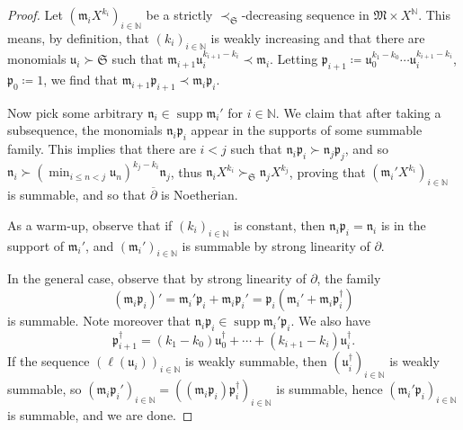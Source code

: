 \documentclass{article}
\newcommand{\assign}{\coloneqq}
\newcommand{\tmop}[1]{\ensuremath{\operatorname{#1}}}
\theoremstyle{remark}\newtheorem*{convention*}{Convention}
\begin{document}
\begin{proof}
  Let $(\mathfrak{m}_i X^{k_i})_{i \in \mathbb{N}}$ be a strictly
  $\prec_{\mathfrak{S}}$-decreasing sequence in $\mathfrak{M} \times
  X^{\mathbb{N}}$. This means, by definition, that $(k_i)_{i \in \mathbb{N}}$
  is weakly increasing and that there are monomials $\mathfrak{u}_i \succ
  \mathfrak{S}$ such that $\mathfrak{m}_{i + 1} \mathfrak{u}_i^{k_{i + 1} -
  k_i} \prec \mathfrak{m}_i$. Letting $\mathfrak{p}_{i + 1} \assign
  \mathfrak{u}_0^{k_1 - k_0} \cdots \mathfrak{u}_i^{k_{i + 1} - k_i}$,
  $\mathfrak{p}_0 \assign 1$, we find that $\mathfrak{m}_{i + 1}
  \mathfrak{p}_{i + 1} \prec \mathfrak{m}_i \mathfrak{p}_i$.
  
  Now pick some arbitrary $\mathfrak{n}_i \in \tmop{supp} \mathfrak{m}_i'$ for
  $i \in \mathbb{N}$. We claim that after taking a subsequence, the monomials
  $\mathfrak{n}_i \mathfrak{p}_i$ appear in the supports of some summable
  family. This implies that there are $i < j$ such that $\overset{}{}
  \mathfrak{n}_i \mathfrak{p}_i \succ \mathfrak{n}_j \mathfrak{p}_j$, and so
  $\mathfrak{n}_i \succ (\min_{i \leqslant n < j} \mathfrak{u}_n) ^{k_j - k_i}
  \mathfrak{n}_j$, thus $\mathfrak{n}_i X^{k_i} \succ_{\mathfrak{S}}
  \mathfrak{n}_j X^{k_j}$, proving that $(\mathfrak{m}_i' X^{k_i})_{i \in
  \mathbb{N}}$ is summable, and so that $\overline{\partial}$ is Noetherian.
  
  As a warm-up, observe that if $(k_i)_{i \in \mathbb{N}}$ is constant, then
  $\mathfrak{n}_i \mathfrak{p}_i =\mathfrak{n}_i$ is in the support of
  $\mathfrak{m}_i'$, and $(\mathfrak{m}_i')_{i \in \mathbb{N}}$ is summable by
  strong linearity of $\partial$.
  
  In the general case, observe that by strong linearity of $\partial$, the
  family
  \[ (\mathfrak{m}_i \mathfrak{p}_i)' =\mathfrak{m}_i' \mathfrak{p}_i
     +\mathfrak{m}_i \mathfrak{p}_i' =\mathfrak{p}_i  (\mathfrak{m}_i'
     +\mathfrak{m}_i \mathfrak{p}_i^{\dag}) \]
  is summable. Note moreover that $\mathfrak{n}_i \mathfrak{p}_i \in
  \tmop{supp} \mathfrak{m}_i' \mathfrak{p}_i$. We also have
  \[ \mathfrak{p}_{i + 1}^{\dagger} = (k_1 - k_0) \mathfrak{u}_0^{\dagger} +
     \cdots + (k_{i + 1} - k_i) \mathfrak{u}_i^{\dag} . \]
  If the sequence $(\ell (\mathfrak{u}_i))_{i \in \mathbb{N}}$ is weakly
  summable, then $(\mathfrak{u}_i^{\dagger})_{i \in \mathbb{N}}$ is weakly
  summable, so $ (\mathfrak{m}_i \mathfrak{p}_i')_{i \in \mathbb{N}} =
  ((\mathfrak{m}_i \mathfrak{p}_i) \mathfrak{p}_i^{\dagger})_{i \in
  \mathbb{N}}$ is summable, hence $(\mathfrak{m}_i' \mathfrak{p}_i)_{i \in
  \mathbb{N}}$ is summable, and we are done.
  

\end{proof}
\end{document}
